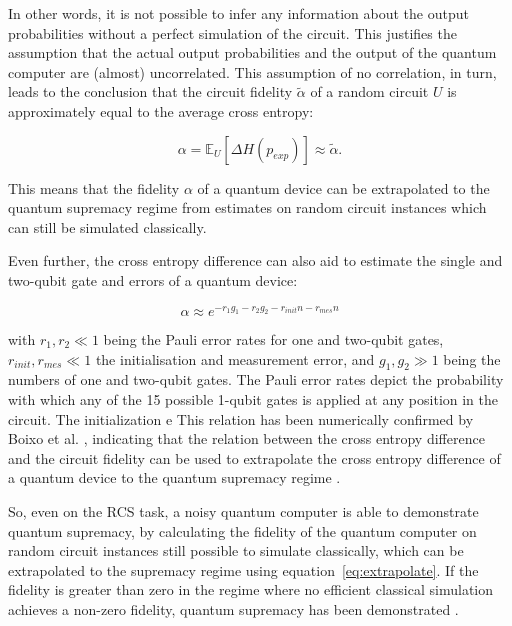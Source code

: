 In other words, it is not possible to infer any information about the output
probabilities without a perfect simulation of the circuit.
This justifies the assumption that the actual output probabilities and the output
of the quantum computer are (almost) uncorrelated.
This assumption of no correlation, in turn, leads to the conclusion that the
circuit fidelity $\tilde{\alpha}$ of a random
circuit $U$ is approximately equal to the average cross entropy:

\begin{equation}
  \label{eq:extrapolate}
  \alpha = \mathbb{E}_U[\Delta H(p_{exp})] \approx \tilde{\alpha}.
\end{equation}

This means that the fidelity $\alpha$ of a quantum device can be extrapolated to
the quantum supremacy regime from estimates on random circuit instances
which can still be simulated classically.

Even further, the cross entropy difference can also aid to estimate
the single and two-qubit gate and errors of a quantum device:

\begin{equation}
  \alpha \approx e^{-r_1g_1 - r_2g_2 -r_{init}n -r_{mes}n}
\end{equation}

with $r_1, r_2 \ll 1$ being the Pauli error rates for one and two-qubit gates, $r_{init},
r_{mes} \ll 1$ the initialisation and measurement error, and $g_1,g_2 \gg 1$ being the
numbers of one and two-qubit gates. The Pauli error rates depict the 
probability with which any of the 15 possible 1-qubit gates is applied at any position in the circuit.
The initialization e This relation has been numerically confirmed by
Boixo et al. \cite{Boixo2018supremacy}, indicating that the relation between the
cross entropy difference and the circuit fidelity can be used to extrapolate the
cross entropy difference of a quantum device to the quantum supremacy regime \cite{Boixo2018supremacy}.

So, even on the RCS task, a noisy quantum computer is able to demonstrate quantum
supremacy, by calculating the fidelity of the quantum computer on random circuit instances still possible to simulate
classically, which can be extrapolated to the supremacy regime using
equation~\ref{eq:extrapolate}.
If the fidelity is greater than zero in the regime where no efficient classical simulation achieves
a non-zero fidelity,
quantum supremacy has been demonstrated \cite{Boixo2018supremacy}.


